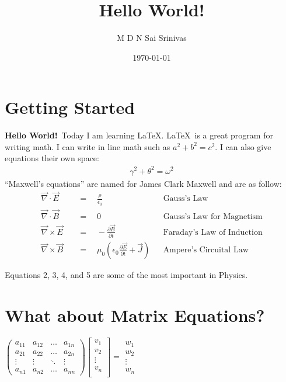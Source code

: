\documentclass{article}
\title{Hello World!}
\author{M D N Sai Srinivas}
\date{\today}
\begin{document}
\maketitle
\section{Getting Started}

{\bfseries Hello World!}\ Today I am learning \LaTeX. \LaTeX\ is a great program for writing math. I can write in line math such as \( a^2 + b^2 = c^2 \). I can also give equations their own space:
\begin{align}
\gamma^2 + \theta^2 = \omega^2 
\end{align}
``Maxwell's equations'' are named for James Clark Maxwell and are as follow:
\begin{align}
\vec{\nabla} \cdot \vec{E} \quad & = \quad \frac{\rho}{\epsilon_0} & & \text{Gauss's Law}  \\
\vec{\nabla} \cdot \vec{B} \quad & = \quad 0 & & \text{Gauss's Law for Magnetism} \\
\vec{\nabla} \times \vec{E} \quad & = \quad -\frac{\partial \vec{B}}{\partial t} & & \text{Faraday's Law of Induction} \\
\vec{\nabla} \times \vec{B} \quad & = \quad \mu_0 \left( \epsilon_0 \frac{\partial \vec{E}}{\partial t} + \vec{J} \right) & & \text{Ampere's Circuital Law} 
\end{align}

Equations \color{blue}2\color{black}, \color{blue}3\color{black}, \color{blue}4\color{black}, and \color{blue}5 \color{black}are some of the most important in Physics.

\section{What about Matrix Equations?}
\begin{center}
$
\begin{pmatrix}
a_{11} & a_{12} & \dots & a_{1n} \\
a_{21} & a_{22} & \dots & a_{2n} \\
\vdots & \vdots & \ddots & \vdots \\
a_{n1} & a_{n2} & \dots & a_{nn} 
\end{pmatrix} 
\begin{bmatrix}
v_1 \\
v_2 \\
\vdots \\
v_n \\
\end{bmatrix}
= 
\begin{matrix}
w_1 \\
w_2 \\
\vdots \\
w_n
\end{matrix}
$
\end{center}
\end{document}
